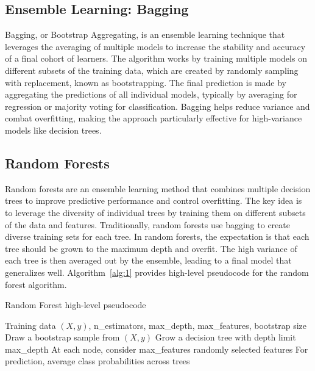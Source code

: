 \documentclass[conference]{IEEEtran}
\begin{document}
\subsection{Ensemble Learning: Bagging}
Bagging, or Bootstrap Aggregating, is an ensemble learning technique that leverages the averaging of multiple models to increase the stability and accuracy of a final cohort of learners. The algorithm works by training multiple models on different subsets of the training data, which are created by randomly sampling with 
 replacement, known as bootstrapping. The final prediction is made by aggregating the predictions of all individual models, typically by 
 averaging for regression or majority voting for classification. Bagging helps reduce variance and combat overfitting, making the approach 
 particularly effective for high-variance models like decision trees.

\subsection{Random Forests}

Random forests are an ensemble learning method that combines multiple decision trees to improve predictive performance and control overfitting. The key idea is to leverage the diversity of individual trees by training them on different subsets of the data and features. Traditionally, random forests use bagging to create diverse training sets for each tree. In random forests, the expectation is that each tree should be grown to the maximum depth and overfit. The high variance of each tree is then averaged out by the ensemble, leading to a final model that generalizes well.
Algorithm~\ref{alg:1} provides high-level pseudocode for the random forest algorithm.
\begin{algorithm}[H]
\caption{Random Forest high-level pseudocode}
\begin{algorithmic}[1]
\REQUIRE Training data $(X, y)$, n\_estimators, max\_depth, max\_features, bootstrap size
  \STATE Draw a bootstrap sample from $(X, y)$  %
  \STATE Grow a decision tree with depth limit max\_depth
  \STATE At each node, consider max\_features randomly selected features
\ENDFOR
\STATE For prediction, average class probabilities across trees
\end{algorithmic}
\label{alg:1}
\end{algorithm}
\end{document}

